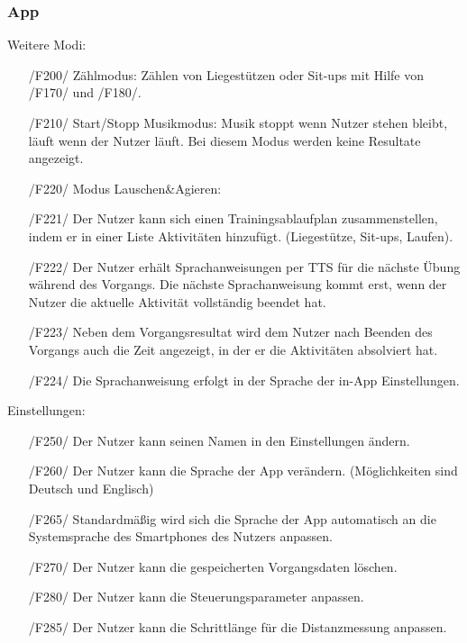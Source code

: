 \documentclass[a4paper,12pt]{article}
\begin{document}
    \subsubsection{App}
    \textsf{Weitere Modi:}
    \begin{itemize}

       
       
        \item[/F200/] \textsf{Zählmodus:} Zählen von Liegestützen oder Sit-ups mit Hilfe von /F170/ und /F180/.
        \item[/F210/] \textsf{Start/Stopp Musikmodus:} Musik stoppt wenn Nutzer stehen bleibt, läuft wenn der Nutzer läuft. Bei diesem Modus werden keine Resultate angezeigt.
      
 	    \item[/F220/] \textsf{Modus \glqq Lauschen\&Agieren\grqq:}
 	    
        \item[/F221/]Der Nutzer kann sich einen Trainingsablaufplan zusammenstellen, indem er in einer Liste Aktivitäten hinzufügt. (Liegestütze, Sit-ups, Laufen). 
        \item[/F222/] Der Nutzer erhält Sprachanweisungen per TTS für die nächste Übung während des Vorgangs. Die nächste Sprachanweisung kommt erst, wenn der Nutzer die aktuelle Aktivität vollständig beendet hat.
        \item[/F223/] Neben dem Vorgangsresultat wird dem Nutzer nach Beenden des Vorgangs auch die Zeit angezeigt, in der er die Aktivitäten absolviert hat.
        \item[/F224/] Die Sprachanweisung erfolgt in der Sprache der in-App Einstellungen.
   \end{itemize}
		\textsf{Einstellungen:}
   \begin{itemize}
        \item[/F250/] Der Nutzer kann seinen Namen in den Einstellungen ändern.
        \item[/F260/] Der Nutzer kann die Sprache der App verändern. (Möglichkeiten sind Deutsch und Englisch)
        \item[/F265/] Standardmäßig wird sich die Sprache der App automatisch an die Systemsprache des Smartphones des Nutzers anpassen.
        \item[/F270/] Der Nutzer kann die gespeicherten \Gls{Vorgangsdaten} löschen.
        \item[/F280/] Der Nutzer kann die \Gls{Steuerungsparameter} anpassen. 
        \item[/F285/] Der Nutzer kann die Schrittlänge für die Distanzmessung anpassen.
  	\end{itemize}
\end{document}
